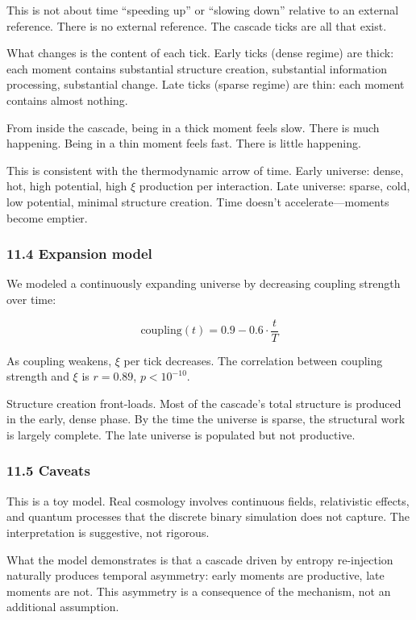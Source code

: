 \documentclass[
  11pt,
  a4paper]{article}
\begin{document}
This is not about time ``speeding up'' or ``slowing down'' relative to
an external reference. There is no external reference. The cascade ticks
are all that exist.

What changes is the content of each tick. Early ticks (dense regime) are
thick: each moment contains substantial structure creation, substantial
information processing, substantial change. Late ticks (sparse regime)
are thin: each moment contains almost nothing.

From inside the cascade, being in a thick moment feels slow. There is
much happening. Being in a thin moment feels fast. There is little
happening.

This is consistent with the thermodynamic arrow of time. Early universe:
dense, hot, high potential, high \(\xi\) production per interaction.
Late universe: sparse, cold, low potential, minimal structure creation.
Time doesn't accelerate---moments become emptier.

\subsubsection{11.4 Expansion model}\label{expansion-model}

We modeled a continuously expanding universe by decreasing coupling
strength over time:

\[\text{coupling}(t) = 0.9 - 0.6 \cdot \frac{t}{T}\]

As coupling weakens, \(\xi\) per tick decreases. The correlation between
coupling strength and \(\xi\) is \(r = 0.89\), \(p < 10^{-10}\).

Structure creation front-loads. Most of the cascade's total structure is
produced in the early, dense phase. By the time the universe is sparse,
the structural work is largely complete. The late universe is populated
but not productive.

\subsubsection{11.5 Caveats}\label{caveats}

This is a toy model. Real cosmology involves continuous fields,
relativistic effects, and quantum processes that the discrete binary
simulation does not capture. The interpretation is suggestive, not
rigorous.

What the model demonstrates is that a cascade driven by entropy
re-injection naturally produces temporal asymmetry: early moments are
productive, late moments are not. This asymmetry is a consequence of the
mechanism, not an additional assumption.
\end{document}

